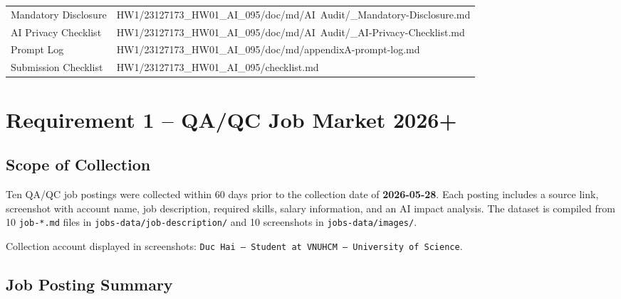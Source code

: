 \documentclass[12pt, a4paper]{article}
\begin{document}
\begin{longtable}{@{} L{4.8cm} p{9.2cm} @{}}
Mandatory Disclosure
  & {\small\ttfamily HW1/23127173\_HW01\_AI\_095/doc/md/AI~Audit/\_Mandatory-Disclosure.md} \\[2pt]
AI Privacy Checklist
  & {\small\ttfamily HW1/23127173\_HW01\_AI\_095/doc/md/AI~Audit/\_AI-Privacy-Checklist.md} \\[2pt]
Prompt Log
  & {\small\ttfamily HW1/23127173\_HW01\_AI\_095/doc/md/\allowbreak appendixA-prompt-log.md} \\[2pt]
Submission Checklist
  & {\small\ttfamily HW1/23127173\_HW01\_AI\_095/checklist.md} \\
\bottomrule
\end{longtable}

\section{Requirement 1 -- QA/QC Job Market 2026+}

\subsection{Scope of Collection}

Ten QA/QC job postings were collected within 60 days prior to the collection date of \textbf{2026-05-28}. Each posting includes a source link, screenshot with account name, job description, required skills, salary information, and an AI impact analysis. The dataset is compiled from 10 \texttt{job-*.md} files in \texttt{jobs-data/job-description/} and 10 screenshots in \texttt{jobs-data/images/}.

Collection account displayed in screenshots: \texttt{Duc Hai -- Student at VNUHCM -- University of Science}.

\subsection{Job Posting Summary}
\end{document}

